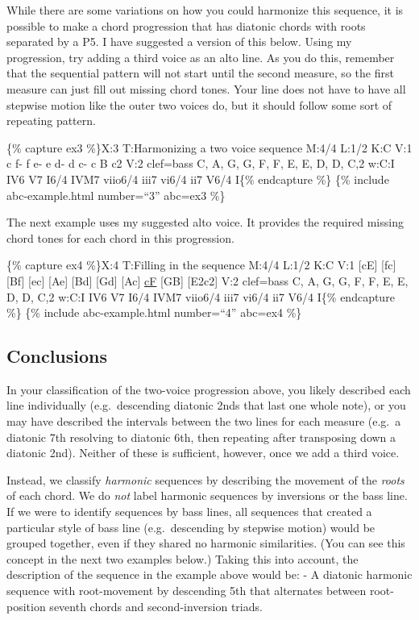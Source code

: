 \documentclass{book}
\begin{document}
While there are some variations on how you could harmonize this sequence, it
is possible to make a chord progression that has diatonic chords with roots
separated by a P5. I have suggested a version of this below. Using my
progression, try adding a third voice as an alto line. As you do this,
remember that the sequential pattern will not start until the second measure,
so the first measure can just fill out missing chord tones. Your line does not
have to have all stepwise motion like the outer two voices do, but it should
follow some sort of repeating pattern.

\{\% capture ex3 \%\}X:3 T:Harmonizing a two voice sequence M:4/4 L:1/2 K:C
V:1 c f-\textbar{} f e-\textbar{} e d-\textbar{} d c-\textbar{} c B\textbar{}
c2\textbar{]} V:2 clef=bass C, A,\textbar{} G, G,\textbar{} F, F,\textbar{} E,
E,\textbar{} D, D,\textbar{} C,2\textbar{]} w:C:I IV6 V7 I6/4 IVM7 viio6/4
iii7 vi6/4 ii7 V6/4 I\{\% endcapture \%\} \{\% include abc-example.html
number=``3'' abc=ex3 \%\}

The next example uses my suggested alto voice. It provides the required
missing chord tones for each chord in this progression.

\{\% capture ex4 \%\}X:4 T:Filling in the sequence M:4/4 L:1/2 K:C V:1
{[}cE{]} {[}fc{]}\textbar{} {[}Bf{]} {[}ec{]}\textbar{} {[}Ae{]}
{[}Bd{]}\textbar{} {[}Gd{]} {[}Ac{]}\textbar{} \href{cantusFirmus.html}{cF}
{[}GB{]}\textbar{} {[}E2c2{]}\textbar{]} V:2 clef=bass C, A,\textbar{} G,
G,\textbar{} F, F,\textbar{} E, E,\textbar{} D, D,\textbar{} C,2\textbar{]}
w:C:I IV6 V7 I6/4 IVM7 viio6/4 iii7 vi6/4 ii7 V6/4 I\{\% endcapture \%\} \{\%
include abc-example.html number=``4'' abc=ex4 \%\}

\hypertarget{conclusions-21}{%
\subsection{Conclusions}\label{conclusions-21}}

In your classification of the two-voice progression above, you likely
described each line individually (e.g.~descending diatonic 2nds that last one
whole note), or you may have described the intervals between the two lines for
each measure (e.g.~a diatonic 7th resolving to diatonic 6th, then repeating
after transposing down a diatonic 2nd). Neither of these is sufficient,
however, once we add a third voice.

Instead, we classify \emph{harmonic} sequences by describing the movement of
the \emph{roots} of each chord. We do \emph{not} label harmonic sequences by
inversions or the bass line. If we were to identify sequences by bass lines,
all sequences that created a particular style of bass line (e.g.~descending by
stepwise motion) would be grouped together, even if they shared no harmonic
similarities. (You can see this concept in the next two examples below.)
Taking this into account, the description of the sequence in the example above
would be: - A diatonic harmonic sequence with root-movement by descending 5th
that alternates between root-position seventh chords and second-inversion
triads.
\end{document}
